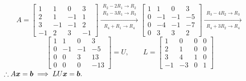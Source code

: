 \begin{solution}[8.0cm]
\[
A=\begin{bmatrix}
1 & 1 & 0 & 3\\
2 & 1 & -1 & 1\\
3 & -1 & -1 & 2\\
-1 & 2 & 3 & -1
\end{bmatrix}
\xrightarrow[
{\displaystyle
\begin{array}{l}
R_4+R_1\to R_4
\end{array}}]
{{\displaystyle
\begin{array}{l}
R_2-2R_1\to R_2\\
R_3-3R_1\to R_3
\end{array}}
}
\begin{bmatrix}
1 & 1 & 0 & 3\\
0 & -1 & -1 & -5\\
0 & -4 & -1 & -7\\
0 & 3 & 3 & 2
\end{bmatrix}
\xrightarrow[
{\displaystyle
\begin{array}{l}
R_4+3R_2\to R_4
\end{array}}]
{\displaystyle
\begin{array}{l}
R_3-4R_2\to R_3
\end{array}}
\]
\[
\begin{bmatrix}
1 & 1 & 0 & 3\\
0 & -1 & -1 & -5\\
0 & 0 & 3 & 13\\
0 & 0 & 0 & -13
\end{bmatrix}
=U,
\qquad
L=\begin{bmatrix}
1 & 0 & 0 & 0\\
2 & 1 & 0 & 0\\
3 & 4 & 1 & 0\\
-1 & -3 & 0 &1
\end{bmatrix}
\]
\(\therefore A\boldsymbol{x} = \boldsymbol{b} \implies LU\boldsymbol{x} = \boldsymbol{b}.\)


\end{solution}
